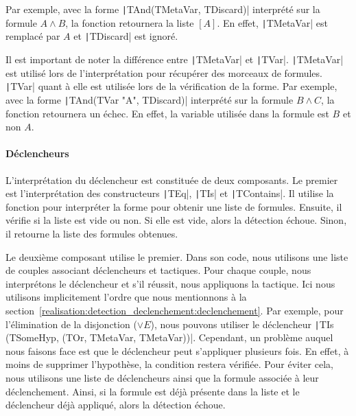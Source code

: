 \documentclass[french,titlepage]{article}
\begin{document}
Par exemple, avec la forme \texttt|TAnd(TMetaVar, TDiscard)| interprété sur la formule $A \land B$, la fonction retournera la liste $[A]$. En effet, \texttt|TMetaVar| est remplacé par $A$ et \texttt|TDiscard| est ignoré.

Il est important de noter la différence entre \texttt|TMetaVar| et \texttt|TVar|. \texttt|TMetaVar| est utilisé lors de l'interprétation pour récupérer des morceaux de formules. \texttt|TVar| quant à elle est utilisée lors de la vérification de la forme. Par exemple, avec la forme \texttt|TAnd(TVar "A", TDiscard)| interprété sur la formule $B \land C$, la fonction retournera un échec. En effet, la variable utilisée dans la formule est $B$ et non $A$.

\paragraph{Déclencheurs} \label{realisation:langage_detecter:interpretation:declencheurs}
L'interprétation du déclencheur est constituée de deux composants. Le premier est l'interprétation des constructeurs \texttt|TEq|, \texttt|TIs| et \texttt|TContains|. Il utilise la fonction pour interpréter la forme pour obtenir une liste de formules. Ensuite, il vérifie si la liste est vide ou non. Si elle est vide, alors la détection échoue. Sinon, il retourne la liste des formules obtenues.

Le deuxième composant utilise le premier. Dans son code, nous utilisons une liste de couples associant déclencheurs et tactiques. Pour chaque couple, nous interprétons le déclencheur et s'il réussit, nous appliquons la tactique. Ici nous utilisons implicitement l'ordre que nous mentionnons à la section~\ref{realisation:detection_declenchement:declenchement}. Par exemple, pour l'élimination de la disjonction ($\lor E$), nous pouvons utiliser le déclencheur \texttt|TIs (TSomeHyp, (TOr, TMetaVar, TMetaVar))|. Cependant, un problème auquel nous faisons face est que le déclencheur peut s'appliquer plusieurs fois. En effet, à moins de supprimer l'hypothèse, la condition restera vérifiée. Pour éviter cela, nous utilisons une liste de déclencheurs ainsi que la formule associée à leur déclenchement. Ainsi, si la formule est déjà présente dans la liste et le déclencheur déjà appliqué, alors la détection échoue.
\end{document}
